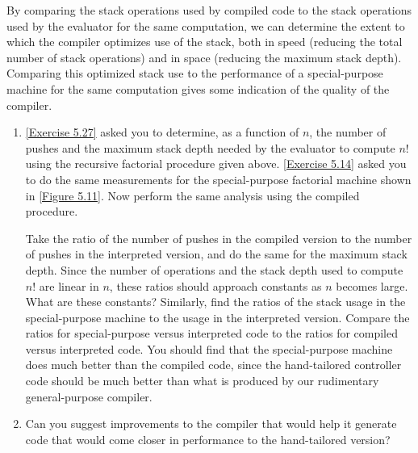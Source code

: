 \begin{exercise}
	\label{Exercise 5.45}
	By comparing the stack operations used by compiled code to the stack operations used by the evaluator for the same computation, we can determine the extent to which the compiler optimizes use of the stack, both in speed (reducing the total number of stack operations) and in space (reducing the maximum stack depth).
	Comparing this optimized stack use to the performance of a special-purpose machine for the same computation gives some indication of the quality of the compiler.
	\begin{enumerate}[label = \alph*., leftmargin = *]

		\item
			\cref{Exercise 5.27} asked you to determine, as a function of \( n \), the number of pushes and the maximum stack depth needed by the evaluator to compute \( n! \) using the recursive factorial procedure given above.
			\cref{Exercise 5.14} asked you to do the same measurements for the special-purpose factorial machine shown in \cref{Figure 5.11}.
			Now perform the same analysis using the compiled  procedure.

			Take the ratio of the number of pushes in the compiled version to the number of pushes in the interpreted version, and do the same for the maximum stack depth.
			Since the number of operations and the stack depth used to compute \( n! \) are linear in \( n \), these ratios should approach constants as \( n \) becomes large.
			What are these constants?
			Similarly, find the ratios of the stack usage in the special-purpose machine to the usage in the interpreted version.
			Compare the ratios for special-purpose versus interpreted code to the ratios for compiled versus interpreted code.
			You should find that the special-purpose machine does much better than the compiled code, since the hand-tailored controller code should be much better than what is produced by our rudimentary general-purpose compiler.

		\item
			Can you suggest improvements to the compiler that would help it generate code that would come closer in performance to the hand-tailored version?

	\end{enumerate}
\end{exercise}



